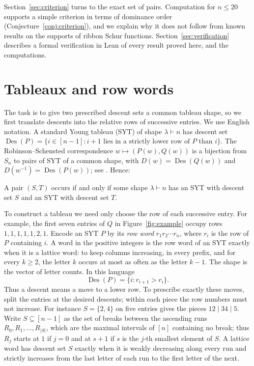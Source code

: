 \documentclass[12pt]{article}
\numberwithin{theorem}{section}
\numberwithin{equation}{section}
\DeclareMathOperator{\Des}{Des}
\begin{document}
Section~\ref{sec:criterion} turns to the exact set of pairs. Computation for $n\le20$ supports a simple
criterion in terms of dominance order (Conjecture~\ref{conj:criterion}), and we explain why it does not
follow from known results on the supports of ribbon Schur functions. Section~\ref{sec:verification}
describes a formal verification in Lean of every result proved here, and the computations.

\section{Tableaux and row words}\label{sec:prelim}

The task is to give two prescribed descent sets a common tableau shape, so we first translate descents into the relative rows of successive entries. We use English notation. A standard Young tableau (SYT) of shape $\lambda\vdash n$ has descent set
$\Des(P)=\{i\in[n-1]: i+1 \text{ lies in a strictly lower row of } P \text{ than } i\}$. The
Robinson--Schensted correspondence $w\mapsto(P(w),Q(w))$ is a bijection from $S_n$ to pairs of SYT of a common
shape, with $D(w)=\Des(Q(w))$ and $D(w^{-1})=\Des(P(w))$; see \cite[Section~7.23]{ec2}. Hence:

\begin{lemma}\label{lem:reduce}
A pair $(S,T)$ occurs if and only if some shape $\lambda\vdash n$ has an SYT with descent set $S$ and an SYT
with descent set $T$.
\end{lemma}

To construct a tableau we need only choose the row of each successive entry. For example, the first seven entries of $Q$ in Figure~\ref{fig:example} occupy rows $1,1,1,1,1,2,1$. Encode an SYT $P$ by its \emph{row word} $r_1r_2\cdots r_n$, where $r_i$ is the row of
$P$ containing $i$. A word in the positive integers is the row word of an SYT exactly when it is a lattice
word: to keep columns increasing, in every prefix, and for every $k\ge2$, the letter $k$ occurs at most as often as the letter $k-1$. The
shape is the vector of letter counts. In this language
\[
\Des(P)=\{i: r_{i+1}>r_i\}.
\]
Thus a descent means a move to a lower row. To prescribe exactly these moves, split the entries at the desired descents; within each piece the row numbers must not increase. For instance $S=\{2,4\}$ on five entries gives the pieces $12\mid34\mid5$. Write $S\subseteq[n-1]$ as the set of breaks between the ascending runs $R_0,R_1,\dots,R_{|S|}$, which are the
maximal intervals of $[n]$ containing no break; thus $R_j$ starts at $1$ if $j=0$ and at $s+1$ if $s$ is the
$j$-th smallest element of $S$. A lattice word has descent set $S$ exactly when it is weakly decreasing along
every run and strictly increases from the last letter of each run to the first letter of the next.
\end{document}
